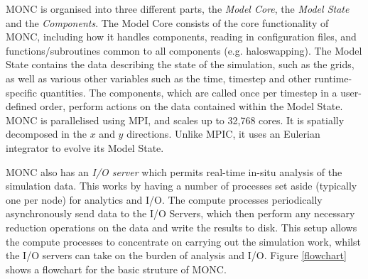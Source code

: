\documentclass{article}
\begin{document}
MONC is organised into three different parts, the \emph{Model Core}, the \emph{Model State} and the \emph{Components}. The Model Core consists of the core functionality of MONC, including how it handles components, reading in configuration files, and functions/subroutines common to all components (e.g. haloswapping). The Model State contains the data describing the state of the simulation, such as the grids, as well as various other variables such as the time, timestep and other runtime-specific quantities. The components, which are called once per timestep in a user-defined order, perform actions on the data contained within the Model State. MONC is parallelised using MPI, and scales up to 32,768 cores. It is spatially decomposed in the $x$ and $y$ directions. Unlike MPIC, it uses an Eulerian integrator to evolve its Model State.

MONC also has an \emph{I/O server} which permits real-time in-situ analysis of the simulation data. This works by having a number of processes set aside (typically one per node) for analytics and I/O. The compute processes periodically asynchronously send data to the I/O Servers, which then perform any necessary reduction operations on the data and write the results to disk. This setup allows the compute processes to concentrate on carrying out the simulation work, whilst the I/O servers can take on the burden of analysis and I/O. Figure \ref{flowchart} shows a flowchart for the basic struture of MONC.
\end{document}
